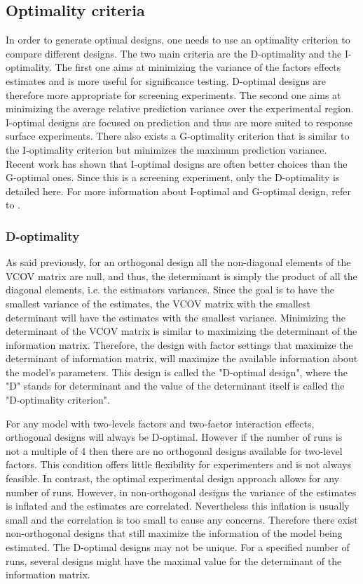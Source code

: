 \subsection{Optimality criteria}
In order to generate optimal designs, one needs to use an optimality criterion to compare different designs. 
The two main criteria are the D-optimality and the I-optimality. 
The first one aims at minimizing the variance of the factors effects estimates and is more useful for significance testing. 
D-optimal designs are therefore more appropriate for screening experiments. 
The second one aims at minimizing the average relative prediction variance over the experimental region. 
I-optimal designs are focused on prediction and thus are more suited to response surface experiments.
There also exists a G-optimality criterion that is similar to the I-optimality criterion but minimizes the maximum prediction 
variance. 
Recent work \parencite{rodriguez_generating_2010} has shown that I-optimal designs are often better choices than the G-optimal 
ones. 
Since this is a screening experiment, only the D-optimality is detailed here. 
For more information about I-optimal and G-optimal design, refer to \textcite{goos_optimal_2011,atkinson2014optimal}.

\subsubsection{D-optimality}
As said previously, for an orthogonal design all the non-diagonal elements of the VCOV matrix are null,
and thus, the determinant is simply the product of all the diagonal elements, i.e. the estimators variances.
Since the goal is to have the smallest variance of the estimates, the VCOV matrix with the smallest determinant will have the 
estimates with the smallest variance. 
Minimizing the determinant of the VCOV matrix is similar to maximizing the determinant of the information matrix. 
Therefore, the design with factor settings that maximize the determinant of information matrix, 
will maximize the available information about the model's parameters. 
This design is called the "D-optimal design", 
where the "D" stands for determinant and the value of the determinant itself is called the "D-optimality criterion".

For any model with two-levels factors and two-factor interaction effects, orthogonal designs will always be D-optimal. 
However if the number of runs is not a multiple of 4 then there are no orthogonal designs available for two-level factors. 
This condition offers little flexibility for experimenters and is not always feasible. 
In contrast, the optimal experimental design approach allows for any number of runs. 
However, in non-orthogonal designs the variance of the estimates is inflated and the estimates are correlated. 
Nevertheless this inflation is usually small and the correlation is too small to cause any concerns.
Therefore there exist non-orthogonal designs that still maximize the information of the model being estimated.
The D-optimal designs may not be unique. For a specified number of runs,
 several designs might have the maximal value for the determinant of the information matrix.\\


